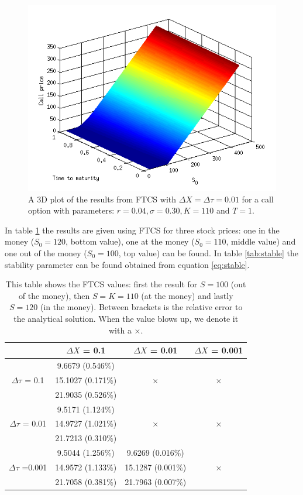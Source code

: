 \documentclass[11pt,a4paper]{article}
\begin{document}
\begin{figure}[h]
\begin{center}
\includegraphics[scale=0.6]{3d.png}
\end{center}
\caption{A 3D plot of the results from FTCS with $\Delta X = \Delta \tau = 0.01$ for a call option with parameters: $r = 0.04, \sigma = 0.30, K = 110$ and $T = 1$.}
\label{fig:3d}
\end{figure}

In table \ref{tab:FTCS} the results are given using FTCS for three stock prices: one in the money ($S_0 = 120$, bottom value), one at the money ($S_0 = 110$, middle value) and one out of the money ($S_0 = 100$, top value) can be found. In table \ref{tab:stable} the stability parameter can be found obtained from equation \ref{eq:stable}.

\begin{table}[h]
\centering
\begin{tabular}{c|c|c|c}
  & $\Delta X$ = 0.1 & $\Delta X$ = 0.01 &$\Delta X$ = 0.001\\
  \hline
  &	9.6679	(0.546\%)	&										&										\\
  $\Delta \tau$ = 0.1 	&	15.1027	(0.171\%)	& $\times$					& $\times$ 					\\
  &	21.9035	(0.526\%)	&										&										\\
  \hline
  &	9.5171	(1.124\%)	&										&										\\
  $\Delta \tau$ = 0.01	&	14.9727	(1.021\%)	&	$\times$					&	$\times$					\\
  &	21.7213 (0.310\%)	&										&										\\
  \hline
  &	9.5044	(1.256\%)	&	9.6269	(0.016\%)	&										\\
  $\Delta \tau$ =0.001	&	14.9572	(1.133\%)	&	15.1287	(0.001\%)	&	$\times$					\\	
  &	21.7058 (0.381\%)	&	21.7963 (0.007\%)	&
\end{tabular}
\caption{This table shows the FTCS values: first the result for $S=100$ (out of the money), then $S=K=110$ (at the money) and lastly $S=120$ (in the money). Between brackets is the relative error to the analytical solution. When the value blows up, we denote it with a $\times$.}
\label{tab:FTCS}
\end{table}
\end{document}
